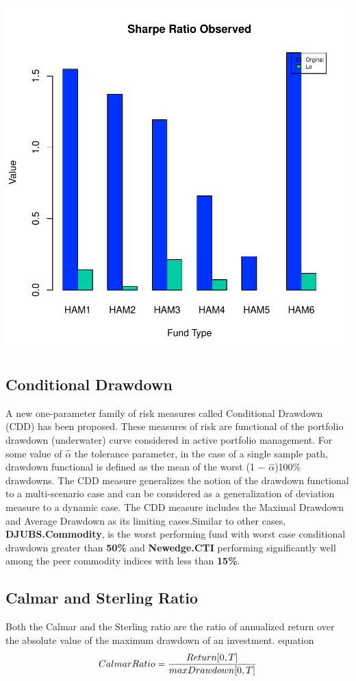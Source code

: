 \documentclass[12pt,letterpaper,english]{article}
\begin{document}
\includegraphics{Managers-006}
\subsection{Conditional Drawdown}
A new one-parameter family of risk measures called Conditional Drawdown (CDD) has
been proposed. These measures of risk are functional of the portfolio drawdown (underwater) curve considered in active portfolio management. For some value of $\hat{\alpha}$ the tolerance parameter, in the case of a single sample path, drawdown functional is defined as the mean of the worst (1 \(-\) $\hat{\alpha}$)100\% drawdowns. The CDD measure generalizes the notion of the drawdown functional to a multi-scenario case and can be considered as a generalization of deviation measure to a dynamic case. The CDD measure includes the Maximal Drawdown and Average Drawdown as its limiting cases.Similar to other cases, \textbf{DJUBS.Commodity}, is the worst performing fund with worst case conditional drawdown greater than \textbf{50\%} and \textbf{Newedge.CTI} performing significantly well among the peer commodity indices with less than \textbf{15\%}.




\subsection{Calmar and Sterling Ratio}
Both the Calmar and the Sterling ratio are the ratio of annualized return over the absolute value of the maximum drawdown of an investment.
{equation}
\begin{equation}
 Calmar Ratio  =  \frac{Return [0,T]}{max Drawdown  [0,T]} \\
\end{equation}
\end{document}
